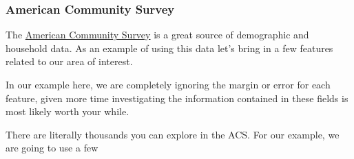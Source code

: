 \documentclass[]{book}
\theoremstyle{definition}
\theoremstyle{definition}
\theoremstyle{definition}
\theoremstyle{remark}
\begin{document}
\subsubsection{American Community
Survey}\label{american-community-survey}

The \href{https://www.census.gov/programs-surveys/acs/}{American
Community Survey} is a great source of demographic and household data.
As an example of using this data let's bring in a few features related
to our area of interest.

In our example here, we are completely ignoring the margin or error for
each feature, given more time investigating the information contained in
these fields is most likely worth your while.

There are literally thousands you can explore in the ACS. For our
example, we are going to use a few
\end{document}
